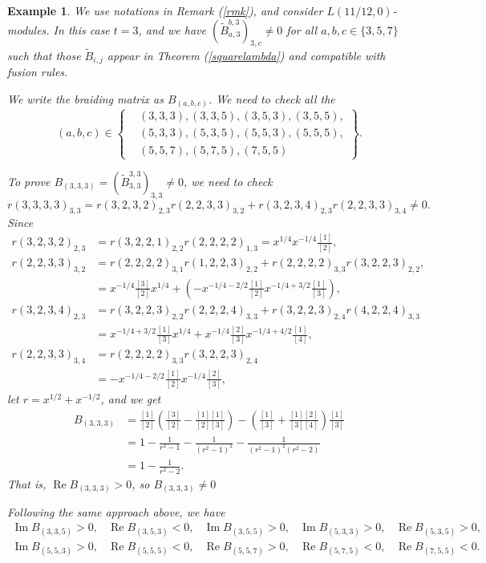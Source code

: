 \documentclass{article}
\newtheorem{example}[lemma]{Example}
\begin{document}
\begin{example}
We use notations in Remark (\ref{rmk}), and consider $L(11/12, 0)$-modules.
In this case $t=3$,
and we have
$\left(\tilde{B}_{a,3}^{b,3}\right)_{3,c}\neq 0$
for all $a,b,c\in \{3,5,7\}$ such that those $\tilde{B}_{i,j}$ 
appear in Theorem (\ref{squarelambda}) and compatible with fusion rules.


We write the braiding matrix as $B_{(a,b,c)}$.
We need to check all the 
$$(a,b,c)\in\left\{\begin{aligned}
&(3,3,3),(3,3,5),(3,5,3),(3,5,5),\\
&(5,3,3),(5,3,5),(5,5,3),(5,5,5),\\
&(5,5,7),(5,7,5),(7,5,5)
\end{aligned}\right\}.$$

To prove $B_{(3,3,3)}=\left(\tilde{B}_{3,3}^{3,3}\right)_{3,3}\neq 0$, 
we need to check 
$$
r(3,3,3,3)_{3,3}=r(3,2,3,2)_{2,3}r(2,2,3,3)_{3,2}+r(3,2,3,4)_{2,3}r(2,2,3,3)_{3,4}\neq 0.
$$
Since 
$$\begin{aligned}
r(3,2,3,2)_{2,3}&=r(3,2,2,1)_{2,2}r(2,2,2,2)_{1,3}=x^{1/4}x^{-1/4}\frac{[1]}{[2]},\\
r(2,2,3,3)_{3,2}&=r(2,2,2,2)_{3,1}r(1,2,2,3)_{2,2}+r(2,2,2,2)_{3,3}r(3,2,2,3)_{2,2},\\
&=x^{-1/4}\frac{[3]}{[2]}x^{1/4}+\left(-x^{-1/4-2/2}\frac{[1]}{[2]}x^{-1/4+3/2}\frac{[1]}{[3]}\right),\\
r(3,2,3,4)_{2,3}&=r(3,2,2,3)_{2,2}r(2,2,2,4)_{3,3}+r(3,2,2,3)_{2,4}r(4,2,2,4)_{3,3}\\
&=x^{-1/4+3/2}\frac{[1]}{[3]}x^{1/4}+x^{-1/4}\frac{[2]}{[3]}x^{-1/4+4/2}\frac{[1]}{[4]},\\
r(2,2,3,3)_{3,4}&=r(2,2,2,2)_{3,3}r(3,2,2,3)_{2,4}\\
&=-x^{-1/4-2/2}\frac{[1]}{[2]}x^{-1/4}\frac{[2]}{[3]},
\end{aligned}$$
let $r=x^{1/2}+x^{-1/2}$, and we get 
$$
\begin{aligned}
B_{(3,3,3)}
&=\frac{[1]}{[2]}\left(\frac{[3]}{[2]}-\frac{[1][1]}{[2][3]}\right)-\left(\frac{[1]}{[3]}+\frac{[1][2]}{[3][4]}\right)\frac{[1]}{[3]}\\
&=1-\frac{1}{r^2-1}-\frac{1}{(r^2-1)^2}-\frac{1}{(r^2-1)^2(r^2-2)}\\
&=1-\frac{1}{r^2-2}.
\end{aligned}
$$
That is, $\operatorname{Re}B_{(3,3,3)}> 0$, so $B_{(3,3,3)}\neq 0$

Following the same approach above, we have
$$\begin{aligned}
\operatorname{Im}B_{(3,3,5)}>0,&
\operatorname{Re}B_{(3,5,3)}<0,&
\operatorname{Im}B_{(3,5,5)}>0,&
\operatorname{Im}B_{(5,3,3)}>0,&
\operatorname{Re}B_{(5,3,5)}>0,\\
\operatorname{Im}B_{(5,5,3)}>0,&
\operatorname{Re}B_{(5,5,5)}<0,&
\operatorname{Re}B_{(5,5,7)}>0,&
\operatorname{Re}B_{(5,7,5)}<0,&
\operatorname{Re}B_{(7,5,5)}<0.
\end{aligned}$$


\end{example}
\end{document}
